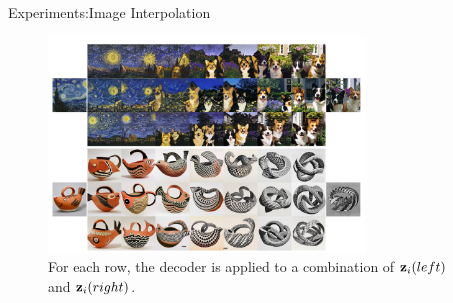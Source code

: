 \documentclass[aspectratio=169, 9pt]{beamer}
\theoremstyle{definition}
\begin{document}
\begin{frame}{Experiments:Image Interpolation}
  \begin{figure}[h]
    \centering
    \includegraphics[width=0.75\textwidth]{./pic/dalle-image_interp.png}
    \caption{For each row, the decoder is applied to a combination of
    ${\mathbf{z}}_i(left)$ and ${\mathbf{z}}_i(right)$.}
  \end{figure}
\end{frame}
\end{document}
